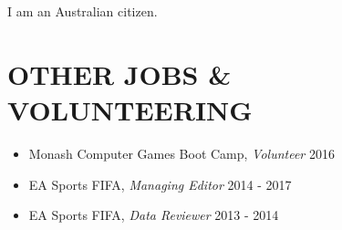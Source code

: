 \documentclass[margin, 10pt]{res} %
\begin{document}
\begin{resume}
I am an Australian citizen.


\section{OTHER JOBS \& \\ VOLUNTEERING} 

\begin{itemize} \itemsep -11pt
\item Monash Computer Games Boot Camp, {\sl Volunteer} \hfill 2016 \\
\item EA Sports FIFA, {\sl Managing Editor} \hfill 2014 - 2017\\
\item EA Sports FIFA, {\sl Data Reviewer} \hfill 2013 - 2014 \\
 
\end{itemize}



\end{resume}
\end{document}
